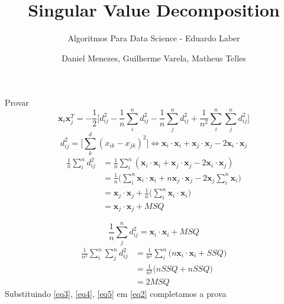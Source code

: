 \documentclass[aspectratio=169]{beamer}
\title{Singular Value Decomposition}
\subtitle{Algoritmos Para Data Science - Eduardo Laber}
\author{Daniel Menezes, Guilherme Varela, Matheus Telles}
\begin{document}
	\begin{frame}
		\titlepage
	\end{frame}
	\begin{frame}[t]
		\begin{scriptsize}
		Provar
		\begin{equation}\label{eq1}
			\textbf{x}_i\textbf{x}^T_j = -\frac{1}{2}\bigg[ d^2_{ij} - \frac{1}{n}\sum\limits_i^n d^2_{ij} - \frac{1}{n}\sum\limits_j^n d^2_{ij} + \frac{1}{n^2}\sum\limits_i^n \sum\limits_j^n d^2_{ij}\bigg]
		\end{equation} 
		\begin{equation}\label{eq2}
			d^2_{ij} = \bigg[  \sum^d_k \left(x_{ik} - x_{jk} \right)^2\bigg] \Leftrightarrow\textbf{x}_i \cdot\textbf{x}_i + \textbf{x}_j\cdot\textbf{x}_j - 2\textbf{x}_i\cdot\textbf{x}_j
		\end{equation} 
			\begin{align}\label{eq3}
				\frac{1}{n}\sum\limits_i^n d^2_{ij} &= 
				\frac{1}{n}\sum\limits_i^n \left(\textbf{x}_i \cdot\textbf{x}_i + \textbf{x}_j\cdot\textbf{x}_j - 2\textbf{x}_i\cdot\textbf{x}_j\right)\nonumber\\
				&=\frac{1}{n}\Big(\sum\limits_i^n \textbf{x}_i \cdot\textbf{x}_i+ n\textbf{x}_j \cdot\textbf{x}_j
				-2\textbf{x}_j\sum\limits_i^n\textbf{x}_i \Big)\nonumber\\
				&=\textbf{x}_j \cdot\textbf{x}_j + \frac{1}{n}\Big(\sum\limits_i^n \textbf{x}_i \cdot\textbf{x}_i\Big)\nonumber\\
				&=\textbf{x}_j \cdot\textbf{x}_j + MSQ
		\end{align}
		\end{scriptsize}
	\end{frame}				
	\begin{frame}[t]
		\begin{equation}\label{eq4}
			\frac{1}{n}\sum\limits_j^n d^2_{ij} = \textbf{x}_i \cdot\textbf{x}_i + MSQ
		\end{equation} 
		\begin{align}\label{eq5}
		\frac{1}{n^2}\sum\limits_i^n\sum\limits_j^n d^2_{ij} &=  \frac{1}{n^2}\sum\limits_i^n \bigg(n\textbf{x}_i\cdot\textbf{x}_i +  SSQ\bigg)\nonumber\\
		&= \frac{1}{n^2}\bigg( nSSQ+ nSSQ\bigg)\nonumber\\
		&=2MSQ
		\end{align}
		Substituindo \ref{eq3}, \ref{eq4}, \ref{eq5} em \ref{eq2} completamos a prova
	\end{frame}
\end{document}
